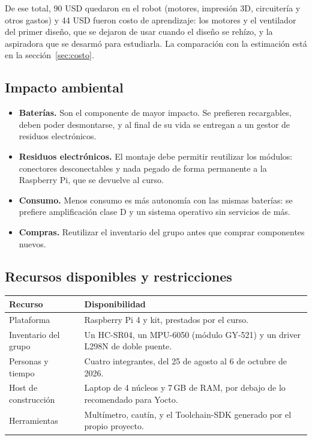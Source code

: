 \documentclass[11pt,a4paper]{article}
\begin{document}
De ese total, 90 USD quedaron en el robot (motores, impresión 3D,
circuitería y otros gastos) y 44 USD fueron costo de aprendizaje: los
motores y el ventilador del primer diseño, que se dejaron de usar cuando el
diseño se rehízo, y la aspiradora que se desarmó para estudiarla. La
comparación con la estimación está en la sección~\ref{sec:costo}.

\subsection{Impacto ambiental}

\begin{itemize}
  \item \textbf{Baterías.} Son el componente de mayor impacto. Se prefieren
        recargables, deben poder desmontarse, y al final de su vida se
        entregan a un gestor de residuos electrónicos.
  \item \textbf{Residuos electrónicos.} El montaje debe permitir reutilizar
        los módulos: conectores desconectables y nada pegado de forma
        permanente a la Raspberry Pi, que se devuelve al curso.
  \item \textbf{Consumo.} Menos consumo es más autonomía con las mismas
        baterías: se prefiere amplificación clase D y un sistema operativo
        sin servicios de más.
  \item \textbf{Compras.} Reutilizar el inventario del grupo antes que
        comprar componentes nuevos.
\end{itemize}

\subsection{Recursos disponibles y restricciones}

\begin{center}
\begin{tabularx}{\linewidth}{L{3.6cm}Y}
\toprule
\textbf{Recurso} & \textbf{Disponibilidad} \\
\midrule
Plataforma & Raspberry Pi 4 y kit, prestados por el curso. \\
Inventario del grupo & Un HC-SR04, un MPU-6050 (módulo GY-521) y un driver
L298N de doble puente. \\
Personas y tiempo & Cuatro integrantes, del 25 de agosto al 6 de octubre de
2026. \\
Host de construcción & Laptop de 4 núcleos y 7\,GB de RAM, por debajo de lo
recomendado para Yocto. \\
Herramientas & Multímetro, cautín, y el Toolchain-SDK generado por el propio
proyecto. \\
\bottomrule
\end{tabularx}
\end{center}
\end{document}
